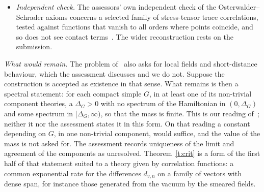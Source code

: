 \begin{itemize}
$\mu_v((0,u])\le M_vu^2$ for $u\le1$ and $v_+$ is the part of $v$ orthogonal to the zero-energy vectors, then
by the identity in Remark~\ref{r:weight} $\|H^{-1/2}v_+\|^2\le M_v+\|v_+\|^2$. This is the quantity of
Remark~\ref{r:forms}(a), but for one continuum vector at a time. Hypothesis~\ref{h:mix} asks for a bound
uniform over the unit vectors of the fine detail at each regulator, and bounds of the first kind on a dense
set do not give one: on $L^2((0,1),2E\,dE)$ with $H$ multiplication by $E$, every bounded function $f$ has
$\mu_f((0,u])\le\|f\|_\infty^2u^2$, while the unit vectors $\varepsilon^{-1}\mathbf 1_{(0,\varepsilon)}$ have
$\langle h,H^{-1}h\rangle=2/\varepsilon$, and the spectrum is $[0,1]$. (This item is due to an OpenAI GPT
model used as reviewer.)
\item \emph{Independent check.} The assessors' own independent check of the Osterwalder--Schrader axioms concerns a selected family of
stress-tensor trace correlations, tested against functions that vanish to all orders where points coincide,
and so does not see contact terms~\cite[Part~II]{YMG}. The wider reconstruction rests on the submission.
\end{itemize}

\emph{What would remain.} The problem of~\cite{JW} also asks for local fields and short-distance behaviour,
which the assessment discusses and we do not. Suppose the construction is accepted as existence in that
sense. What remains is then a spectral statement: for each compact simple $G$, in at least one of its
non-trivial component theories, a $\Delta_G>0$ with no spectrum of the Hamiltonian in $(0,\Delta_G)$ and some
spectrum in $[\Delta_G,\infty)$, so that the mass is finite. This is our reading of~\cite{JW}; neither it nor
the assessment states it in this form. On that reading a constant depending on $G$, in one non-trivial
component, would suffice, and the value of the mass is not asked for. The assessment records uniqueness of
the limit and agreement of the components as unresolved. Theorem~\ref{t:crit} is a form of the first half of that statement suited to a
theory given by correlation functions: a common exponential rate for the differences $d_{v,n}$ on a family of
vectors with dense span, for instance those generated from the vacuum by the smeared fields.

